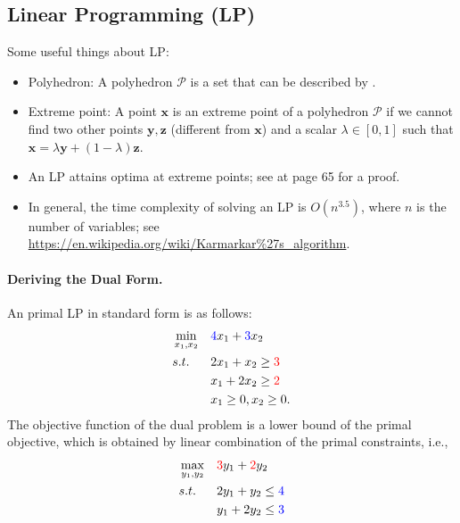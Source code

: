 

\subsection{Linear Programming (LP)}
    Some useful things about LP:
    \begin{itemize}
        \item Polyhedron: A polyhedron $\mathcal{P}$ is a set that can be described by .
        \item Extreme point: A point $\bm{x}$ is an extreme point of a polyhedron $\mathcal{P}$ if we cannot find two other points $\bm{y}, \bm{z}$ (different from $\bm{x}$) and a scalar $\lambda \in [0, 1]$ such that $\bm{x} = \lambda \bm{y} + (1-\lambda) \bm{z}$.
        \item An LP attains optima at extreme points; see \cite{bertsimas1997introduction} at page 65 for a proof.
        \item In general, the time complexity of solving an LP is $O(n^{3.5})$, where $n$ is the number of variables; see \url{https://en.wikipedia.org/wiki/Karmarkar%27s_algorithm}. 
    \end{itemize}

    \paragraph{Deriving the Dual Form.}
    An primal LP in standard form is as follows:
        \begin{equation}
            \begin{aligned}
                & \min_{x_1, x_2} & &   \textcolor{blue}{4} x_1 + \textcolor{blue}{3} x_2 \\
                & s.t.            &  & 2 x_1 + x_2 \ge \textcolor{red}{3} \\
                &                 &  & x_1 + 2 x_2 \ge \textcolor{red}{2} \\
                &                 &  & x_1 \ge 0, x_2 \ge 0.
            \end{aligned}
        \end{equation}
    The objective function of the dual problem is a lower bound of the primal objective, which is obtained by linear combination of the primal constraints, i.e., 
        \begin{equation}
            \begin{aligned}
                & \max_{y_1, y_2} & &   \textcolor{red}{3} y_1 + \textcolor{red}{2} y_2\\
                & s.t.            &  & 2 y_1 + y_2 \le \textcolor{blue}{4} \\
                &                 &  & y_1 + 2 y_2 \le \textcolor{blue}{3} 
            \end{aligned}
        \end{equation}
    
